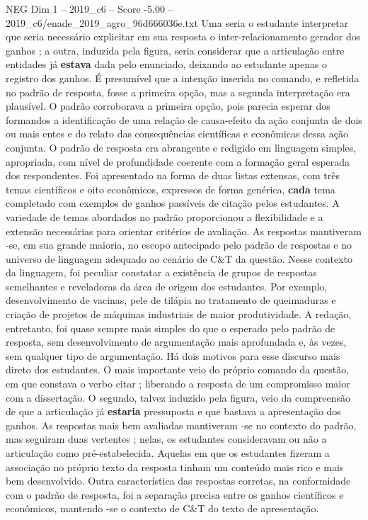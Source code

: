 \begin{textsample}{NEG Dim 1 – 2019\_c6 – Score -5.00 – 2019\_c6/enade\_2019\_agro\_96d666036e.txt}
Uma seria o estudante interpretar que seria necessário explicitar em sua resposta o inter-relacionamento gerador dos ganhos ; a outra, induzida pela figura, seria considerar que a articulação entre entidades já \textbf{estava} dada pelo enunciado, deixando ao estudante apenas o registro dos ganhos.
É presumível que a intenção inserida no comando, e refletida no padrão de resposta, fosse a primeira opção, mas a segunda interpretação era plausível.
O padrão corroborava a primeira opção, pois parecia esperar dos formandos a identificação de uma relação de causa-efeito da ação conjunta de dois ou mais entes e do relato das consequências científicas e econômicas dessa ação conjunta.
O padrão de resposta era abrangente e redigido em linguagem simples, apropriada, com nível de profundidade coerente com a formação geral esperada dos respondentes.
Foi apresentado na forma de duas listas extensas, com três temas científicos e oito econômicos, expressos de forma genérica, \textbf{cada} tema completado com exemplos de ganhos passíveis de citação pelos estudantes.
A variedade de temas abordados no padrão proporcionou a flexibilidade e a extensão necessárias para orientar critérios de avaliação.
As respostas mantiveram -se, em sua grande maioria, no escopo antecipado pelo padrão de respostas e no universo de linguagem adequado ao cenário de C\&T da questão.
Nesse contexto da linguagem, foi peculiar constatar a existência de grupos de respostas semelhantes e reveladoras da área de origem dos estudantes.
Por exemplo, desenvolvimento de vacinas, pele de tilápia no tratamento de queimaduras e criação de projetos de máquinas industriais de maior produtividade.
A redação, entretanto, foi quase sempre mais simples do que o esperado pelo padrão de resposta, sem desenvolvimento de argumentação mais aprofundada e, às vezes, sem qualquer tipo de argumentação.
Há dois motivos para esse discurso mais direto dos estudantes.
O mais importante veio do próprio comando da questão, em que constava o verbo citar ; liberando a resposta de um compromisso maior com a dissertação.
O segundo, talvez induzido pela figura, veio da compreensão de que a articulação já \textbf{estaria} pressuposta e que bastava a apresentação dos ganhos.
As respostas mais bem avaliadas mantiveram -se no contexto do padrão, mas seguiram duas vertentes ; nelas, os estudantes consideravam ou não a articulação como pré-estabelecida.
Aquelas em que os estudantes fizeram a associação no próprio texto da resposta tinham um conteúdo mais rico e mais bem desenvolvido.
Outra característica das respostas corretas, na conformidade com o padrão de resposta, foi a separação precisa entre os ganhos científicos e econômicos, mantendo -se o contexto de C\&T do texto de apresentação.

\end{textsample}
